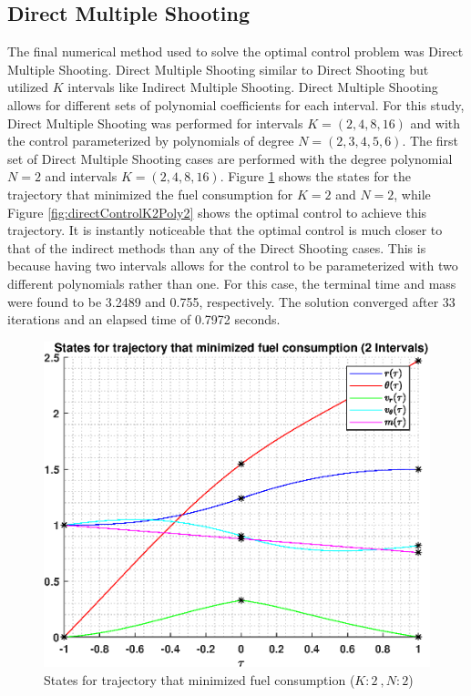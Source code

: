 \documentclass[]{article}
\begin{document}
\subsection{Direct Multiple Shooting}
The final numerical method used to solve the optimal control problem was Direct Multiple Shooting. Direct Multiple Shooting similar to Direct Shooting but utilized \(K\) intervals like Indirect Multiple Shooting. Direct Multiple Shooting allows for different sets of polynomial coefficients for each interval. For this study, Direct Multiple Shooting was performed for intervals \(K = (2,4,8,16)\) and with the control parameterized by polynomials of degree \(N = (2,3,4,5,6)\).
\vspace{2mm}\newline 
The first set of Direct Multiple Shooting cases are performed with the degree polynomial \(N = 2\) and intervals \(K = (2,4,8,16)\). Figure \ref{fig:directStatesK2Poly2} shows the states for the trajectory that minimized the fuel consumption for \(K = 2\) and  \(N = 2\), while Figure \ref{fig:directControlK2Poly2} shows the optimal control to achieve this trajectory. It is instantly noticeable that the optimal control is much closer to that of the indirect methods than any of the Direct Shooting cases. This is because having two intervals allows for the control to be parameterized with two different polynomials rather than one. For this case, the terminal time and mass were found to be 3.2489 and 0.755, respectively. The solution converged after 33 iterations and an elapsed time of 0.7972 seconds.
\begin{figure}
	\centering
	\includegraphics[scale=0.75]{directStatesK2Poly2.eps}
	\caption{States for trajectory that minimized fuel consumption (\(K:2\ , N:2\))}
	\label{fig:directStatesK2Poly2}
\end{figure}
\end{document}
